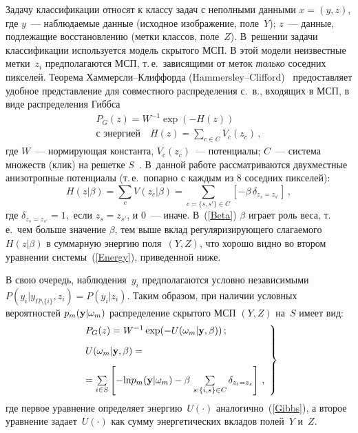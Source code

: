 \begin{multicols}{2}
Задачу классификации относят к классу задач с неполными данными
$x=(y,z)$, где $y$~--- наблюдаемые данные (исходное изображение, поле~$Y$);
$z$~--- данные, подлежащие восстановлению (метки классов, поле~$Z$). 
В~решении задачи классификации используется модель скрытого
МСП. В этой модели неизвестные метки~$z_i$ предполагаются МСП, т.\,е.\
зависящими от меток \textit{только} соседних пикселей. Теорема
Хам\-мерс\-ли--Клиф\-фор\-да (Hammersley--Clifford)~\cite{BesagMRF}
предоставляет удобное представление для совместного распределения
с.~в., входящих в МСП, в виде распределения Гиббса
\begin{multline}
\label{Gibbs}
P_{G}(z) = W^{-1}\exp(-H(z))\\
\mbox{с энергией}\quad
H(z) = \sum\limits_{c \in C} V_c(z_c)\,,
\end{multline}
где $W$~--- нормирующая константа, $V_c(z_c)$~--- потенциалы;
$C$~--- система множеств (клик) на решетке $S$~\cite{BesagMRF}. В~данной
работе рассматриваются двухместные анизотропные потенциалы (т.\,е.\
попарно с каж\-дым из 8 соседних пикселей):
\begin{equation}
\label{Beta}
H(z|\beta) = 
\sum\limits_{c}V(z_c|\beta) = \!\!\sum\limits_{c=\{s, s'\}\in C} \left[ - \beta\,\delta_{z_s = z_{s'}}\right]\,,\!\!
\end{equation}
где $\delta_{z_s = z_{s'}} = 1,$ если $z_s = z_{s'}$, и 0~--- иначе.
В~(\ref{Beta}) $\beta$ играет роль веса, т.\,е.\ чем больше значение
$\beta$, тем выше вклад регуляризирующего слагаемого $H(z|\beta)$ в
суммарную энергию поля~$(Y,Z)$, что хорошо видно во втором уравнении
системы~(\ref{Energy}), приведенной ниже.

В свою очередь, наблюдения~$y_i$ предполагаются условно независимыми 
$P(y_i|y_{\Omega\setminus\{i\}},z_i) = P(y_i|z_i)$.
Таким образом, при наличии условных вероятностей $p_m( {\bf y}|\omega_m)$ распределение скрытого МСП $(Y,Z)$ 
на~$S$ имеет вид:
\begin{equation}
\label{Energy}
\left. 
\begin{array}{l}
P_{G}(z) = W^{-1}\exp(-U(\omega_m|{\bf y},\beta))\,;\\[9pt]
U(\omega_m|{\bf y},\beta) =\\[9pt]
= \sum\limits_{i\in S} \left[ - \text{ln} p_m( {\bf y}|\omega_m) - %
\beta\,\sum\limits_{s:\{i,s\}\in C} \delta_{z_i = z_s}\right]\,,
\end{array}
\right \}
\end{equation}
где первое уравнение определяет энергию~$U(\cdot)$ аналогично~(\ref{Gibbs}), 
а второе уравнение задает~$U(\cdot)$ как сумму энергетических вкладов полей~$Y$ и~$Z$.


\end{multicols}

